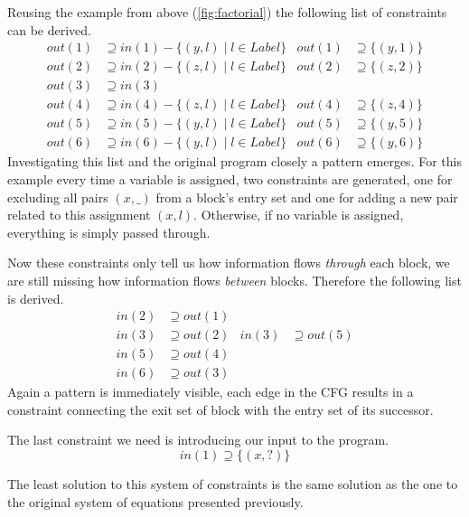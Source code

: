 \documentclass[article]{uibk}
\begin{document}
Reusing the example from above (\cref{fig:factorial}) the following list of
constraints can be derived.
%
\begin{align*}
    out(1) &\supseteq in(1) - \{(y,l) \mid l \in Label\} &
    out(1) &\supseteq \{(y,1)\} \\
    out(2) &\supseteq in(2) - \{(z,l) \mid l \in Label\} &
    out(2) &\supseteq \{(z,2)\} \\
    out(3) &\supseteq in(3) \\
    out(4) &\supseteq in(4) - \{(z,l) \mid l \in Label\} &
    out(4) &\supseteq \{(z,4)\} \\
    out(5) &\supseteq in(5) - \{(y,l) \mid l \in Label\} &
    out(5) &\supseteq \{(y,5)\} \\
    out(6) &\supseteq in(6) - \{(y,l) \mid l \in Label\} &
    out(6) &\supseteq \{(y,6)\}
\end{align*}
%
Investigating this list and the original program closely a pattern emerges. For
this example every time a variable is assigned, two constraints are generated,
one for excluding all pairs $(x,\_)$ from a block's entry set and one for
adding a new pair related to this assignment $(x,l)$. Otherwise, if no variable
is assigned, everything is simply passed through.

Now these constraints only tell us how information flows \emph{through} each
block, we are still missing how information flows \emph{between} blocks.
Therefore the following list is derived.
%
\begin{align*}
    in(2) &\supseteq out(1) \\
    in(3) &\supseteq out(2) & in(3) &\supseteq out(5) \\
    in(5) &\supseteq out(4) \\
    in(6) &\supseteq out(3)
\end{align*}
%
Again a pattern is immediately visible, each edge in the CFG results in a
constraint connecting the exit set of block with the entry set of its
successor.

The last constraint we need is introducing our input to the program.
\[
    in(1) \supseteq \{(x,?)\}
\]

The least solution to this system of constraints is the same solution as the
one to the original system of equations presented previously.

%
\end{document}
